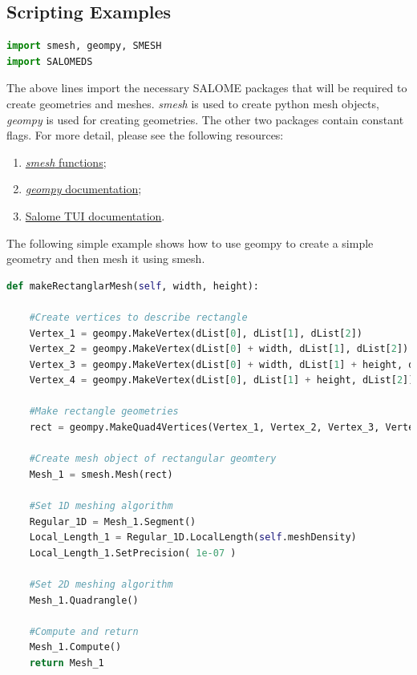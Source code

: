 \subsection{Scripting Examples}

\begin{lstlisting}[language=Python]
import smesh, geompy, SMESH
import SALOMEDS   
\end{lstlisting}

The above lines import the necessary SALOME packages that will be required to create geometries and meshes. \textit{smesh} is used to create python mesh objects,
\textit{geompy} is used for creating geometries. The other two packages contain constant flags. For more detail, please see the following resources:

\begin{enumerate}
 \item \href{http://docs.salome-platform.org/salome_6_5_0/gui/SMESH/smeshpy_doc/smesh_8py.html}{\textit{smesh} functions};
 \item \href{http://docs.salome-platform.org/salome_6_5_0/gui/GEOM/tui_basic_geom_objs_page.html}{\textit{geompy} documentation};
 \item \href{http://docs.salome-platform.org/salome_6_5_0/gui/SMESH/smeshpy_interface_page.html}{Salome TUI documentation}.
\end{enumerate}

The following simple example shows how to use geompy to create a simple geometry and then mesh it using smesh.

\begin{lstlisting}[language=Python]
def makeRectanglarMesh(self, width, height):

    #Create vertices to describe rectangle
    Vertex_1 = geompy.MakeVertex(dList[0], dList[1], dList[2])
    Vertex_2 = geompy.MakeVertex(dList[0] + width, dList[1], dList[2])
    Vertex_3 = geompy.MakeVertex(dList[0] + width, dList[1] + height, dList[2])
    Vertex_4 = geompy.MakeVertex(dList[0], dList[1] + height, dList[2])
    
    #Make rectangle geometries
    rect = geompy.MakeQuad4Vertices(Vertex_1, Vertex_2, Vertex_3, Vertex_4)
    
    #Create mesh object of rectangular geomtery
    Mesh_1 = smesh.Mesh(rect)
    
    #Set 1D meshing algorithm
    Regular_1D = Mesh_1.Segment()
    Local_Length_1 = Regular_1D.LocalLength(self.meshDensity)
    Local_Length_1.SetPrecision( 1e-07 )
    
    #Set 2D meshing algorithm
    Mesh_1.Quadrangle()
    
    #Compute and return
    Mesh_1.Compute()
    return Mesh_1 

\end{lstlisting}

